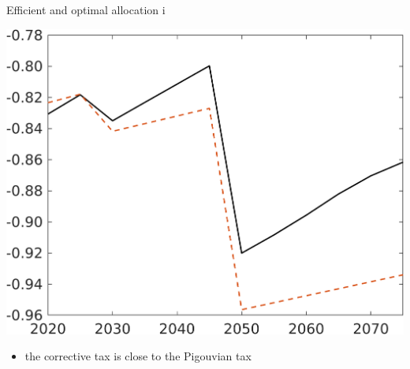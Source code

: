 \documentclass[11pt,aspectratio=169]{beamer}
\begin{document}
\begin{frame}{Efficient and optimal allocation i}
\begin{minipage}[]{0.32\textwidth}
		\includegraphics[width=1\textwidth]{../codding_model/own_basedOnFried/optimalPol_elastS_DisuSci/figures/all_1705/SWF_CompEffOPT_T_NoTaus_noopt_spillover0_noskill0_sep1_BN0_ineq0_red0_xgrowth0_zero0_countec0_etaa0.79_lgd0.png}
	\end{minipage}

\vspace{6mm}
\begin{itemize}
	\item the corrective tax is close to the Pigouvian tax
\end{itemize}
\end{frame}
\addtocounter{framenumber}{-1}
\end{document}
